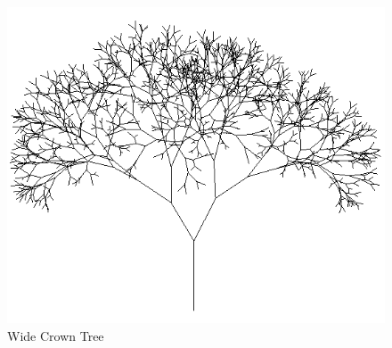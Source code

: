 \documentclass[final]{cmpreport}
\begin{document}
\begin{figure}[ht]
    \includegraphics[scale=0.7]{tree-g.PNG} 
    \centering
    \captionsetup{justification=centering}
    \caption{Wide Crown Tree}
    \label{fig:tree-g}
\end{figure}

\pagebreak

\end{document}
